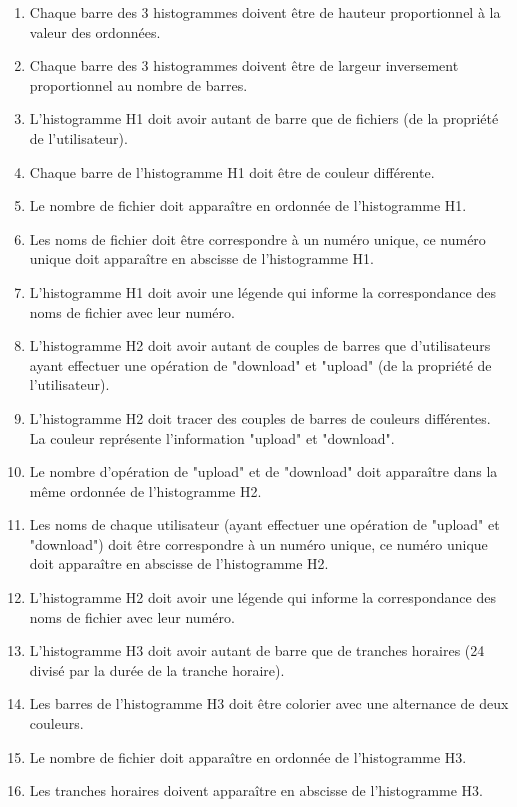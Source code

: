 \documentclass[10pt,a4paper]{report}
\begin{document}
\begin{enumerate}
			\item Chaque barre des 3 histogrammes doivent être de hauteur proportionnel à la valeur des ordonnées.

			\item Chaque barre des 3 histogrammes doivent être de largeur inversement proportionnel au nombre de barres.

			\item L'histogramme H1 doit avoir autant de barre que de fichiers (de la propriété de l'utilisateur).

			\item Chaque barre de l'histogramme H1 doit être de couleur différente.

			\item Le nombre de fichier doit apparaître en ordonnée de l'histogramme H1.

			\item Les noms de fichier doit être correspondre à un numéro unique, ce numéro unique doit apparaître en abscisse de l'histogramme H1.

			\item L'histogramme H1 doit avoir une légende qui informe la correspondance des noms de fichier avec leur numéro.

			\item L'histogramme H2 doit avoir autant de couples de barres que d'utilisateurs ayant effectuer une opération de "download" et "upload" (de la propriété de l'utilisateur).

			\item L'histogramme H2 doit tracer des couples de barres de couleurs différentes. La couleur représente l'information "upload" et "download".

			\item Le nombre d'opération de "upload" et de "download" doit apparaître dans la même ordonnée de l'histogramme H2.

			\item Les noms de chaque utilisateur (ayant effectuer une opération de "upload" et "download") doit être correspondre à un numéro unique, ce numéro unique doit apparaître en abscisse de l'histogramme H2.

			\item L'histogramme H2 doit avoir une légende qui informe la correspondance des noms de fichier avec leur numéro.

			\item L'histogramme H3 doit avoir autant de barre que de tranches horaires (24 divisé par la durée de la tranche horaire).

			\item Les barres de l'histogramme H3 doit être colorier avec une alternance de deux couleurs.

			\item Le nombre de fichier doit apparaître en ordonnée de l'histogramme H3.

			\item Les tranches horaires doivent apparaître en abscisse de l'histogramme H3.

		\end{enumerate}
		
\end{document}
